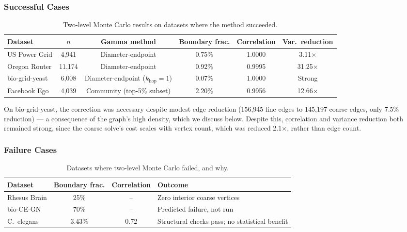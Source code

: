 \documentclass[a4paper,12pt]{amsart}
\numberwithin{equation}{section}
\begin{document}
\subsubsection{Successful Cases}
\hspace{1cm}        %
\begin{table}[h!]
\centering
\begin{tabular}{lccccc}
\hline
Dataset & $n$ & Gamma method & Boundary frac. & Correlation & Var.\ reduction \\
\hline
US Power Grid    & 4{,}941  & Diameter-endpoint            & 0.75\% & 1.0000 & 3.11$\times$ \\
Oregon Router    & 11{,}174 & Diameter-endpoint            & 0.92\% & 0.9995 & 31.25$\times$ \\
bio-grid-yeast   & 6{,}008  & Diameter-endpoint ($k_{\text{hop}}{=}1$) & 0.07\% & 1.0000 & Strong \\
Facebook Ego     & 4{,}039  & Community (top-5\% subset)   & 2.20\% & 0.9956 & 12.66$\times$ \\
\hline
\end{tabular}
\caption{Two-level Monte Carlo results on datasets where the method succeeded.}
\label{tab:successes}
\end{table}

On bio-grid-yeast, the correction was necessary despite modest edge 
reduction (156{,}945 fine edges to 145{,}197 coarse edges, only 
7.5\% reduction) — a consequence of the graph's high density, which we 
discuss below. Despite this, correlation and variance reduction both 
remained strong, since the coarse solve's cost scales with vertex 
count, which was reduced 2.1$\times$, rather than edge count.

\subsubsection{Failure Cases}
\hspace{1cm}       %
\begin{table}[h!]
\centering
\begin{tabular}{lccl}
\hline
Dataset & Boundary frac. & Correlation & Outcome \\
\hline
Rhesus Brain     & 25\% & --   & Zero interior coarse vertices \\
bio-CE-GN        & 70\% & --   & Predicted failure, not run \\
C.\ elegans      & 3.43\% & 0.72 & Structural checks pass; no statistical benefit \\
\hline
\end{tabular}
\caption{Datasets where two-level Monte Carlo failed, and why.}
\label{tab:failures}
\end{table}
\end{document}
